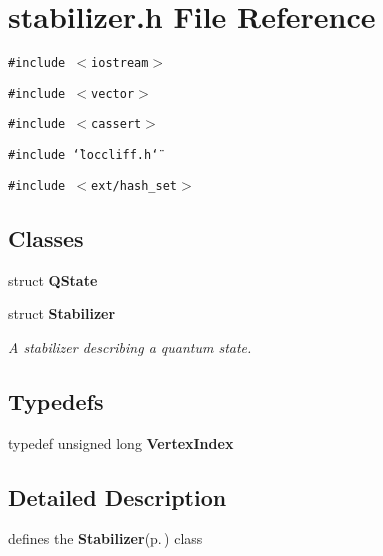\section{stabilizer.h File Reference}
\label{stabilizer_8h}
{\tt \#include $<$iostream$>$}\par
{\tt \#include $<$vector$>$}\par
{\tt \#include $<$cassert$>$}\par
{\tt \#include \char`\"{}loccliff.h\char`\"{}}\par
{\tt \#include $<$ext/hash\_\-set$>$}\par
\subsection*{Classes}
\begin{CompactItemize}
\item 
struct {\bf QState}
\item 
struct {\bf Stabilizer}
\begin{CompactList}\small\item\em A stabilizer describing a quantum state. \item\end{CompactList}\end{CompactItemize}
\subsection*{Typedefs}
\begin{CompactItemize}
\item 
typedef unsigned long {\bf Vertex\-Index}\label{stabilizer_8h_a0}

\end{CompactItemize}


\subsection{Detailed Description}
defines the {\bf Stabilizer}{\rm (p.\,\pageref{structStabilizer})} class